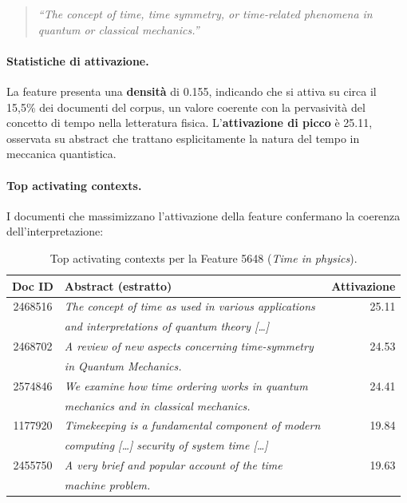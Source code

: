 \begin{quote}
\textit{``The concept of time, time symmetry, or time-related phenomena in quantum or classical mechanics.''}
\end{quote}

\paragraph{Statistiche di attivazione.}
La feature presenta una \textbf{densità} di 0.155, indicando che si attiva su circa il 15,5\% dei documenti del corpus, un valore coerente con la pervasività del concetto di tempo nella letteratura fisica. L'\textbf{attivazione di picco} è 25.11, osservata su abstract che trattano esplicitamente la natura del tempo in meccanica quantistica.

\paragraph{Top activating contexts.}
I documenti che massimizzano l'attivazione della feature confermano la coerenza dell'interpretazione:

\begin{table}[htbp]
    \centering
    \caption{Top activating contexts per la Feature 5648 (\textit{Time in physics}).}
    \label{tab:feature_5648_top}
    \begin{tabular}{@{}clr@{}}
        \toprule
        \textbf{Doc ID} & \textbf{Abstract (estratto)} & \textbf{Attivazione} \\
        \midrule
        2468516 & \textit{The concept of time as used in various applications} & 25.11 \\
                & \textit{and interpretations of quantum theory [\ldots]} & \\
        2468702 & \textit{A review of new aspects concerning time-symmetry} & 24.53 \\
                & \textit{in Quantum Mechanics.} & \\
        2574846 & \textit{We examine how time ordering works in quantum} & 24.41 \\
                & \textit{mechanics and in classical mechanics.} & \\
        1177920 & \textit{Timekeeping is a fundamental component of modern} & 19.84 \\
                & \textit{computing [\ldots] security of system time [\ldots]} & \\
        2455750 & \textit{A very brief and popular account of the time} & 19.63 \\
                & \textit{machine problem.} & \\
        \bottomrule
    \end{tabular}
\end{table}

